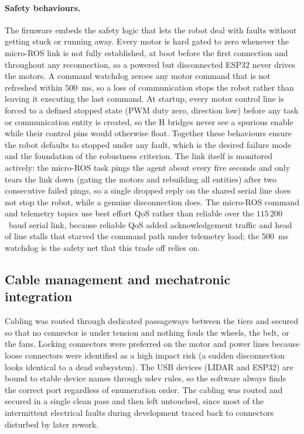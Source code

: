 \documentclass[11pt]{article}
\begin{document}
\paragraph{Safety behaviours.} The firmware embeds the safety logic that lets the robot deal with faults without getting stuck or running away. Every motor is hard gated to zero whenever the micro-ROS link is not fully established, at boot before the first connection and throughout any reconnection, so a powered but disconnected ESP32 never drives the motors. A command watchdog zeroes any motor command that is not refreshed within $500$~ms, so a loss of communication stops the robot rather than leaving it executing the last command. At startup, every motor control line is forced to a defined stopped state (PWM duty zero, direction low) before any task or communication entity is created, so the H bridges never see a spurious enable while their control pins would otherwise float. Together these behaviours ensure the robot defaults to stopped under any fault, which is the desired failure mode and the foundation of the robustness criterion. The link itself is monitored actively: the micro-ROS task pings the agent about every five seconds and only tears the link down (gating the motors and rebuilding all entities) after two consecutive failed pings, so a single dropped reply on the shared serial line does not stop the robot, while a genuine disconnection does. The micro-ROS command and telemetry topics use best effort QoS rather than reliable over the $115\,200$~baud serial link, because reliable QoS added acknowledgement traffic and head of line stalls that starved the command path under telemetry load; the $500$~ms watchdog is the safety net that this trade off relies on.

\subsection{Cable management and mechatronic integration}
Cabling was routed through dedicated passageways between the tiers and secured so that no connector is under tension and nothing fouls the wheels, the belt, or the fans. Locking connectors were preferred on the motor and power lines because loose connectors were identified as a high impact risk (a sudden disconnection looks identical to a dead subsystem). The USB devices (LIDAR and ESP32) are bound to stable device names through udev rules, so the software always finds the correct port regardless of enumeration order. The cabling was routed and secured in a single clean pass and then left untouched, since most of the intermittent electrical faults during development traced back to connectors disturbed by later rework.
\end{document}
